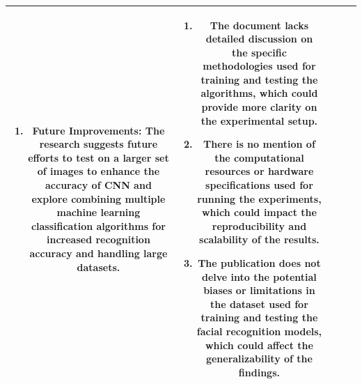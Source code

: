 \documentclass[aspectratio=169]{beamer}
\begin{document}
\begin{frame}
\begin{table}[]
\begin{tabular}{|c|c|c|c|c|}
\begin{minipage}[t]{0.3\textwidth}
\begin{enumerate}
					\item Future Improvements: The research suggests future efforts to test on a larger set of images to enhance the accuracy of CNN and explore combining multiple machine learning classification algorithms for increased recognition accuracy and handling large datasets.
				\end{enumerate}
			\end{minipage} &
			\begin{minipage}[t]{0.3\textwidth}
				\begin{enumerate}
					\item The document lacks detailed discussion on the specific methodologies used for training and testing the algorithms, which could provide more clarity on the experimental setup.
					\item There is no mention of the computational resources or hardware specifications used for running the experiments, which could impact the reproducibility and scalability of the results.
					\item The publication does not delve into the potential biases or limitations in the dataset used for training and testing the facial recognition models, which could affect the generalizability of the findings.
				\end{enumerate}
			\end{minipage}                                                                                                                                                                                                                                                                             \\ \hline
		\end{tabular}
	\end{table}
\end{frame}
\end{document}
